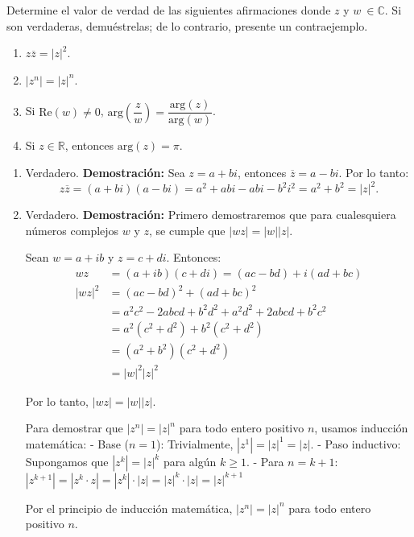 \begin{prob} Determine el valor de verdad de las siguientes afirmaciones donde $z$ y $w\ \in \mathbb{C}$. Si son verdaderas, demuéstrelas; de lo contrario, presente un contraejemplo.

\begin{multicols}{2}
\begin{enumerate}[$a)$]
       \item $z\overline{z}=|z|^2$.
      \item  $|z^n|=|z|^n$.
      \item  Si $\text{Re}(w)\neq 0$, $\text{arg}\left(\dfrac{z}{w}\right)=\dfrac{\text{arg}(z)}{\text{arg}(w)}$.
      \item  Si $z\in\mathbb{R}$, entonces $\text{arg}(z)=\pi$.
\end{enumerate}
\end{multicols}

\begin{myproof}	
\begin{enumerate}[$a)$]
\item Verdadero. \textbf{Demostración:}
Sea $z=a+bi$, entonces $\overline{z}=a-bi$. Por lo tanto:
$$z\overline{z}= (a+bi)(a-bi)= a^2 + abi - abi - b^2i^2 = a^2 + b^2 = |z|^2.$$

\item Verdadero. \textbf{Demostración:} 
Primero demostraremos que para cualesquiera números complejos $w$ y $z$, se cumple que $|wz|=|w||z|$.

Sean $w=a+ib$ y $z=c+di$. Entonces:
\begin{align*}
wz &= (a+ib)(c+di) = (ac-bd) + i(ad+bc)\\
|wz|^2 &= (ac-bd)^2 + (ad+bc)^2\\
&= a^2c^2 - 2abcd + b^2d^2 + a^2d^2 + 2abcd + b^2c^2\\
&= a^2(c^2+d^2) + b^2(c^2+d^2)\\
&= (a^2+b^2)(c^2+d^2)\\
&= |w|^2|z|^2
\end{align*}

Por lo tanto, $|wz| = |w||z|$.

Para demostrar que $|z^n|=|z|^n$ para todo entero positivo $n$, usamos inducción matemática:
- Base ($n=1$): Trivialmente, $|z^1|=|z|^1=|z|$.
- Paso inductivo: Supongamos que $|z^k|=|z|^k$ para algún $k \geq 1$.
- Para $n=k+1$: $|z^{k+1}| = |z^k \cdot z| = |z^k| \cdot |z| = |z|^k \cdot |z| = |z|^{k+1}$

Por el principio de inducción matemática, $|z^n|=|z|^n$ para todo entero positivo $n$.


\end{enumerate}
\end{myproof}
\end{prob}
